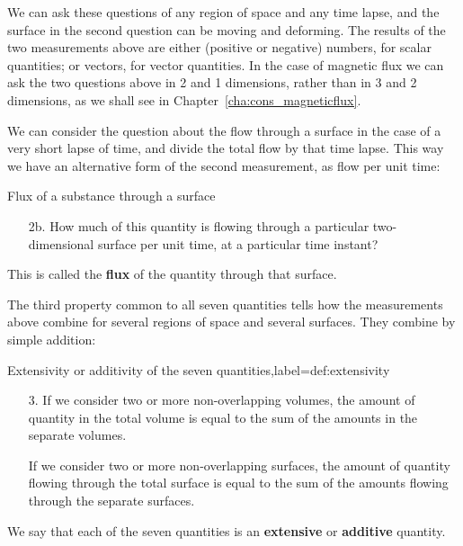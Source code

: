 \documentclass[a4paper,12pt,%
onecolumn,oneside,%
british%
]{memoir}
\renewcommand*{\|}[1][]{\nonscript\:#1\vert\nonscript\:\mathopen{}}
\newcommand*{\chap}{Chapter}%
\begin{document}
We can ask these questions of any region of space and any time lapse, and the surface in the second question can be moving and deforming. The results of the two measurements above are either (positive or negative) numbers, for scalar quantities; or vectors, for vector quantities. In the case of magnetic flux we can ask the two questions above in 2 and 1 dimensions, rather than in 3 and 2 dimensions, as we shall see in \chap~\ref{cha:cons_magneticflux}.

We can consider the question about the flow through a surface in the case of a very short lapse of time, and divide the total flow by that time lapse. This way we have an alternative form of the second measurement, as flow per unit time:
\begin{definition}{Flux of a substance through a surface}
  \begin{enumerate}[label=\arabic*.]\bfseries
  \item[2b.] How much of this quantity is flowing through a particular two-dimensional surface per unit time, at a particular time instant?
  \end{enumerate}
\end{definition}
This is called the \textbf{flux} of the quantity through that surface.

The third property common to all seven quantities tells how the measurements above combine for several regions of space and several surfaces. They combine by simple addition:
\begin{definition}{Extensivity or additivity of the seven quantities,label={def:extensivity}}
\begin{enumerate}[label=\arabic*.]\bfseries
  \item[3.]  If we consider two or more non-overlapping volumes, the amount of quantity in the total volume is equal to the sum of the amounts in the separate volumes.

    If we consider two or more non-overlapping surfaces, the amount of quantity flowing through the total surface is equal to the sum of the amounts flowing through the separate surfaces.
  \end{enumerate}
\end{definition}
We say that each of the seven quantities is an \textbf{extensive} or \textbf{additive} quantity.

\end{document}
